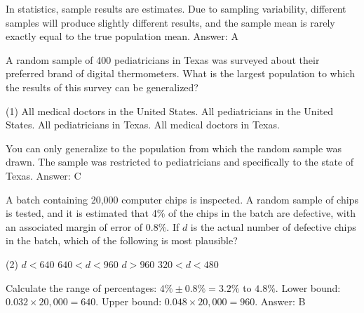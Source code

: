 \documentclass[11pt,paper=a4,answers]{exam}
\begin{document}
\begin{questions}
\begin{solution}
In statistics, sample results are estimates. Due to sampling variability, different samples will produce slightly different results, and the sample mean is rarely exactly equal to the true population mean.
\vspace{5pt}
Answer: \colorbox{yellow!100}{A}
\end{solution}

\vspace{1cm}

\question
A random sample of 400 pediatricians in Texas was surveyed about their preferred brand of digital thermometers. What is the largest population to which the results of this survey can be generalized?
\begin{tasks}(1)
    \task All medical doctors in the United States.
    \task All pediatricians in the United States.
    \task All pediatricians in Texas.
    \task All medical doctors in Texas.
\end{tasks}

\begin{solution}
You can only generalize to the population from which the random sample was drawn. The sample was restricted to pediatricians and specifically to the state of Texas.
\vspace{5pt}
Answer: \colorbox{yellow!100}{C}
\end{solution}

\vspace{1cm}

\question
A batch containing 20,000 computer chips is inspected. A random sample of chips is tested, and it is estimated that 4\% of the chips in the batch are defective, with an associated margin of error of 0.8\%. If $d$ is the actual number of defective chips in the batch, which of the following is most plausible?
\begin{tasks}(2)
    \task $d < 640$ 
    \task $640 < d < 960$ 
    \task $d > 960$ 
    \task $320 < d < 480$
\end{tasks}

\begin{solution}
Calculate the range of percentages: $4\% \pm 0.8\% = 3.2\%$ to $4.8\%$.
\vspace{5pt}
Lower bound: $0.032 \times 20,000 = 640$.
Upper bound: $0.048 \times 20,000 = 960$.
\vspace{5pt}
Answer: \colorbox{yellow!100}{B}
\end{solution}


\end{questions}
\end{document}
